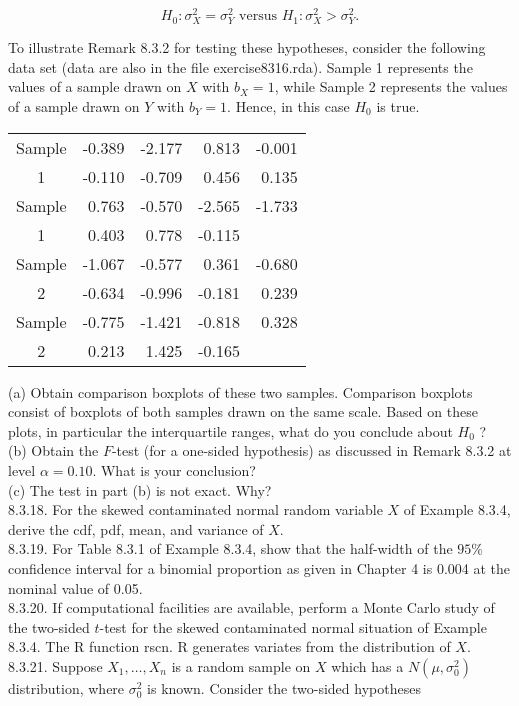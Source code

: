 $$
H_{0}: \sigma_{X}^{2}=\sigma_{Y}^{2} \text { versus } H_{1}: \sigma_{X}^{2}>\sigma_{Y}^{2} .
$$

To illustrate Remark 8.3.2 for testing these hypotheses, consider the following data set (data are also in the file exercise8316.rda). Sample 1 represents the values of a sample drawn on $X$ with $b_{X}=1$, while Sample 2 represents the values of a sample drawn on $Y$ with $b_{Y}=1$. Hence, in this case $H_{0}$ is true.

\begin{center}
\begin{tabular}{|c|rrrr|}
\hline
Sample & -0.389 & -2.177 & 0.813 & -0.001 \\
1 & -0.110 & -0.709 & 0.456 & 0.135 \\
\hline
Sample & 0.763 & -0.570 & -2.565 & -1.733 \\
1 & 0.403 & 0.778 & -0.115 &  \\
\hline
Sample & -1.067 & -0.577 & 0.361 & -0.680 \\
2 & -0.634 & -0.996 & -0.181 & 0.239 \\
\hline
Sample & -0.775 & -1.421 & -0.818 & 0.328 \\
2 & 0.213 & 1.425 & -0.165 &  \\
\hline
\end{tabular}
\end{center}

(a) Obtain comparison boxplots of these two samples. Comparison boxplots consist of boxplots of both samples drawn on the same scale. Based on these plots, in particular the interquartile ranges, what do you conclude about $H_{0}$ ?\\
(b) Obtain the $F$-test (for a one-sided hypothesis) as discussed in Remark 8.3.2 at level $\alpha=0.10$. What is your conclusion?\\
(c) The test in part (b) is not exact. Why?\\
8.3.18. For the skewed contaminated normal random variable $X$ of Example 8.3.4, derive the cdf, pdf, mean, and variance of $X$.\\
8.3.19. For Table 8.3.1 of Example 8.3.4, show that the half-width of the $95 \%$ confidence interval for a binomial proportion as given in Chapter 4 is 0.004 at the nominal value of 0.05.\\
8.3.20. If computational facilities are available, perform a Monte Carlo study of the two-sided $t$-test for the skewed contaminated normal situation of Example 8.3.4. The R function rscn. R generates variates from the distribution of $X$.\\
8.3.21. Suppose $X_{1}, \ldots, X_{n}$ is a random sample on $X$ which has a $N\left(\mu, \sigma_{0}^{2}\right)$ distribution, where $\sigma_{0}^{2}$ is known. Consider the two-sided hypotheses

